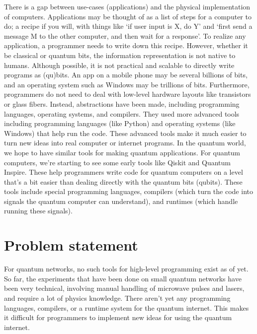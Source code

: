 There is a gap between use-cases (applications) and the physical implementation of computers.
Applications may be thought of as a list of steps for a computer to do; a recipe if you will, with things like `if user input is X, do Y' and `first send a message M to the other computer, and then wait for a response'.
To realize any application, a programmer needs to write down this recipe.
However, whether it be classical or quantum bits, the information representation is not native to humans.
Although possible, it is not practical and scalable to directly write programs as (qu)bits.
An app on a mobile phone may be several billions of bits, and an operating system such as Windows may be trillions of bits.
Furthermore, programmers do not need to deal with low-level hardware layouts like transistors or glass fibers.
Instead, abstractions have been made, including programming languages, operating systems, and compilers.
They used more advanced tools including programming languages (like Python) and operating systems (like Windows) that help run the code.
These advanced tools make it much easier to turn new ideas into real computer or internet programs.
In the quantum world, we hope to have similar tools for making quantum applications.
For quantum computers, we're starting to see some early tools like Qiskit and Quantum Inspire.
These help programmers write code for quantum computers on a level that's a bit easier than dealing directly with the quantum bits (qubits).
These tools include special programming languages, compilers (which turn the code into signals the quantum computer can understand), and runtimes (which handle running these signals).

\section{Problem statement}
For quantum networks, no such tools for high-level programming exist as of yet.
So far, the experiments that have been done on small quantum networks have been very technical, involving manual handling of microwave pulses and lasers, and require a lot of physics knowledge.
There aren't yet any programming languages, compilers, or a runtime system for the quantum internet.
This makes it difficult for programmers to implement new ideas for using the quantum internet.

